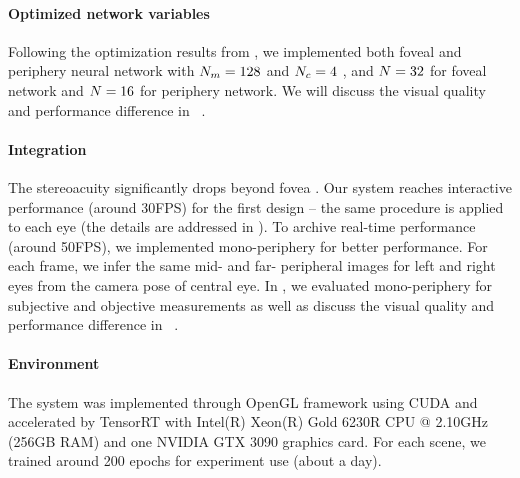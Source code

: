 \paragraph{Optimized network variables}
Following the optimization results from , we implemented both foveal and periphery neural network with $N_{m}=128$ and $N_{c}=4$ , and $N = 32$ for foveal network and $N = 16$ for periphery network. We will discuss the visual quality and performance difference in ~. 
\paragraph{Integration} 
The stereoacuity significantly drops beyond fovea \cite{mochizuki2012magnitude}.
Our system reaches interactive performance (around 30FPS) for the first design -- the same procedure is applied to each eye (the details are addressed in ). To archive real-time performance (around 50FPS), we implemented mono-periphery for better performance. For each frame, we infer the same mid- and far- peripheral images for left and right eyes from the camera pose of central eye. In , we evaluated mono-periphery for subjective and objective measurements as well as discuss the visual quality and performance difference in ~.

\paragraph{Environment}
The system was implemented through OpenGL framework using CUDA and accelerated by TensorRT with Intel(R) Xeon(R) Gold 6230R CPU @ 2.10GHz (256GB RAM) and one NVIDIA GTX 3090 graphics card.
For each scene, we trained around 200 epochs for experiment use (about a day).